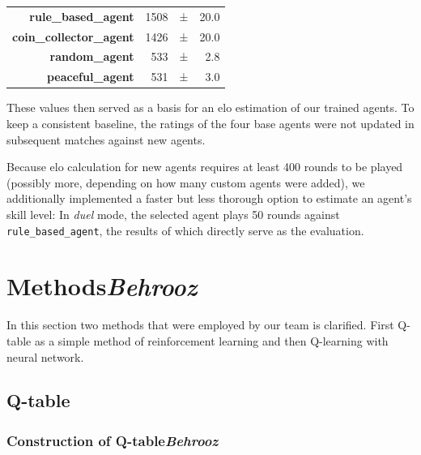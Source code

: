 \documentclass{article}
\begin{document}
\begin{center}
\begin{tabular}{rrcr}
\textbf{rule\_based\_agent} & 1508 & \hspace{-.8em}±\hspace{-.8em} & 20.0 \\
\textbf{coin\_collector\_agent} & 1426 & \hspace{-.8em}±\hspace{-.8em} & 20.0 \\
\textbf{random\_agent} & 533 & \hspace{-.8em}±\hspace{-.8em} & 2.8 \\
\textbf{peaceful\_agent} & 531 & \hspace{-.8em}±\hspace{-.8em} & 3.0
\end{tabular}
\end{center}

These values then served as a basis for an elo estimation of our trained agents. To keep a consistent baseline, the ratings of the four base agents were not updated in subsequent matches against new agents.\par
Because elo calculation for new agents requires at least 400 rounds to be played (possibly more, depending on how many custom agents were added), we additionally implemented a faster but less thorough option to estimate an agent's skill level: In \textit{duel} mode, the selected agent plays 50 rounds against \texttt{rule\_based\_agent}, the results of which directly serve as the evaluation.

\clearpage

\section[Methods]{{Methods}\normalsize \normalfont \it \hfill Behrooz}

In this section two methods that were employed by our team is clarified. First Q-table as a simple method of reinforcement learning and then Q-learning with neural network. 

\subsection[Q-table]{{Q-table}}
\subsubsection[Construction of Q-table]{Construction of Q-table{\normalsize \normalfont \it \hfill Behrooz}}
\end{document}
